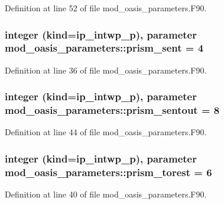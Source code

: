 Definition at line 52 of file mod\+\_\+oasis\+\_\+parameters.\+F90.

\hypertarget{classmod__oasis__parameters_a403c181a893e178ee0ad6ec6f8d26c9c}{
\subsubsection[{prism\+\_\+sent}]{\setlength{\rightskip}{0pt plus 5cm}integer (kind=ip\+\_\+intwp\+\_\+p), parameter mod\+\_\+oasis\+\_\+parameters\+::prism\+\_\+sent = 4}}\label{classmod__oasis__parameters_a403c181a893e178ee0ad6ec6f8d26c9c}


Definition at line 36 of file mod\+\_\+oasis\+\_\+parameters.\+F90.

\hypertarget{classmod__oasis__parameters_a9f683811203a8cf60704b4938a8f3a11}{
\subsubsection[{prism\+\_\+sentout}]{\setlength{\rightskip}{0pt plus 5cm}integer (kind=ip\+\_\+intwp\+\_\+p), parameter mod\+\_\+oasis\+\_\+parameters\+::prism\+\_\+sentout = 8}}\label{classmod__oasis__parameters_a9f683811203a8cf60704b4938a8f3a11}


Definition at line 44 of file mod\+\_\+oasis\+\_\+parameters.\+F90.

\hypertarget{classmod__oasis__parameters_a8d037fafc163f46260a8704f92a885a1}{
\subsubsection[{prism\+\_\+torest}]{\setlength{\rightskip}{0pt plus 5cm}integer (kind=ip\+\_\+intwp\+\_\+p), parameter mod\+\_\+oasis\+\_\+parameters\+::prism\+\_\+torest = 6}}\label{classmod__oasis__parameters_a8d037fafc163f46260a8704f92a885a1}


Definition at line 40 of file mod\+\_\+oasis\+\_\+parameters.\+F90.

